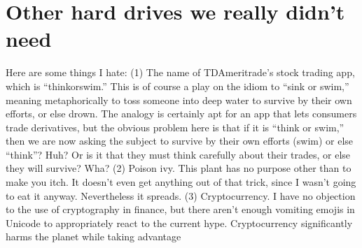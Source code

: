 \documentclass[twocolumn]{article}
\begin{document}
\section{Other hard drives we really didn't need}

Here are some things I hate: (1) The name of TDAmeritrade's stock
trading app, which is ``thinkorswim.'' This is of course a play on the
idiom to ``sink or swim,'' meaning metaphorically to toss someone into
deep water to survive by their own efforts, or else drown. The analogy
is certainly apt for an app that lets consumers trade derivatives, but
the obvious problem here is that if it is ``think or swim,'' then we
are now asking the subject to survive by their own efforts (swim) or
else ``think''? Huh? Or is it that they must think carefully about
their trades, or else they will survive? Wha? \quad (2) Poison ivy.
This plant has no purpose other than to make you itch. It doesn't even
get anything out of that trick, since I wasn't going to eat it anyway.
Nevertheless it spreads. \quad (3) Cryptocurrency. I have no objection
to the use of cryptography in finance, but there aren't enough
vomiting emojis in Unicode to appropriately react to the current hype.
Cryptocurrency significantly harms the planet while taking advantage
\end{document}
